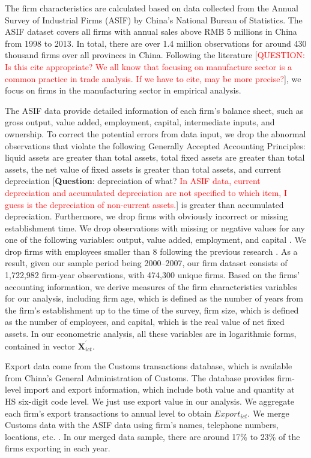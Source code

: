 \documentclass[12pt]{article}
\begin{document}
\label{sec:data_firm} The firm characteristics are calculated based on data
collected from the Annual Survey of Industrial Firms (ASIF) by China's
National Bureau of Statistics. The ASIF dataset covers all firms with annual
sales above RMB 5 millions in China from 1998 to 2013. In total, there are
over 1.4 million observations for around 430 thousand firms over all
provinces in China. Following the literature \citep[e.g.,][]{fu2021trans}[\textcolor{red}{QUESTION: Is this cite appropriate? We all know that focusing on manufacture sector is a common practice in trade analysis. If we have to cite,\cite{brandt2012creative} may be more precise?}],
we focus on firms in the manufacturing sector in empirical analysis.

The ASIF data provide detailed information of each firm's balance sheet,
such as gross output, value added, employment, capital, intermediate inputs,
and ownership. To correct the potential errors from data input, we drop the
abnormal observations that violate the following Generally Accepted
Accounting Principles: liquid assets are greater than total assets, total
fixed assets are greater than total assets, the net value of fixed assets is
greater than total assets, and current depreciation [\textbf{Question}:
depreciation of what? \textcolor{red}{In ASIF data, current depreciation and accumulated depreciation are not specified to which item, I guess is the depreciation of non-current assets.}] is greater than accumulated depreciation.
Furthermore, we drop firms with obviously incorrect or missing establishment
time. We drop observations with missing or negative values for any one of
the following variables: output, value added, employment, and capital \citep{cai2009competition,yu2015processing}. We
drop firms with employees smaller than 8 following the previous research %
\citep{brandt2012creative}. As a result, given our sample period being
2000--2007, our firm dataset consists of 1,722,982 firm-year observations,
with 474,300 unique firms. Based on the firms' accounting information, we
derive measures of the firm characteristics variables for our analysis,
including firm age, which is defined as the number of years from the firm's
establishment up to the time of the survey, firm size, which is defined as
the number of employees, and capital, which is the real value of net fixed
assets. In our econometric analysis, all these variables are in logarithmic
forms, contained in vector $\mathbf{X}_{ict}^{^{\prime }}.$

Export data come from the Customs transactions database, which is available
from China's General Administration of Customs. The database provides
firm-level import and export information, which include both value and
quantity at HS six-digit code level. We just use export value in our
analysis. We aggregate each firm's export transactions to annual level to
obtain $Export_{ict}$. We merge Customs data with the ASIF data using firm's
names, telephone numbers, locations, etc. \citep{yu2015processing}. In our
merged data sample, there are around 17\% to 23\% of the firms exporting in
each year.
\end{document}
